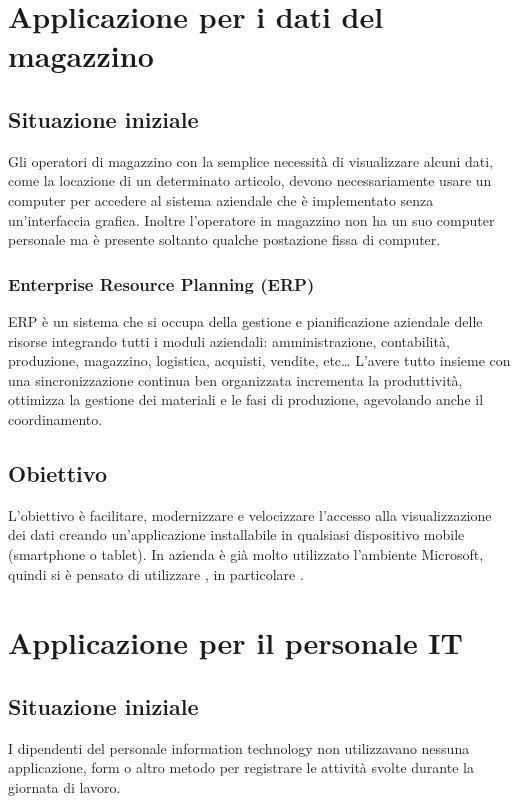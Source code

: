\newpage
\section{Applicazione per i dati del magazzino}
\subsection{Situazione iniziale}
Gli operatori di magazzino con la semplice necessità di visualizzare alcuni dati, come la locazione di un determinato articolo, devono necessariamente usare un computer per accedere al sistema aziendale  che è implementato senza un’interfaccia grafica. 
Inoltre l’operatore in magazzino non ha un suo computer personale ma è presente soltanto qualche postazione fissa di computer.
\subsubsection{Enterprise Resource Planning (ERP)} \label{tec:ERP}
ERP è un sistema che si occupa della gestione e pianificazione aziendale delle risorse integrando tutti i moduli aziendali: amministrazione, contabilità, produzione, magazzino, logistica, acquisti, vendite, etc…
L’avere tutto insieme con una sincronizzazione continua ben organizzata incrementa la produttività, ottimizza la gestione dei materiali e le fasi di produzione, agevolando anche il coordinamento.

\subsection{Obiettivo}
L'obiettivo è facilitare, modernizzare e velocizzare l’accesso alla visualizzazione dei dati creando un’applicazione installabile in qualsiasi dispositivo mobile (smartphone o tablet). 
In azienda è già molto utilizzato l’ambiente Microsoft, quindi si è pensato di utilizzare , in particolare .


\section{Applicazione per il personale IT}
\subsection{Situazione iniziale}
I dipendenti del personale information technology non utilizzavano nessuna applicazione, form o altro metodo per registrare le attività svolte durante la giornata di lavoro.
